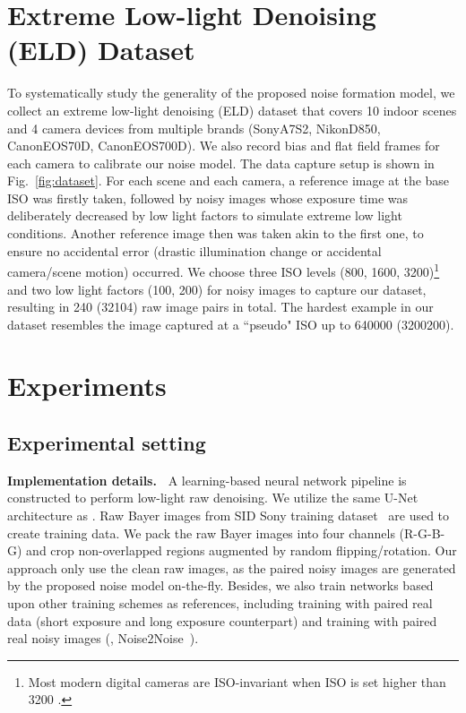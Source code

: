 \documentclass[10pt,twocolumn,letterpaper]{article}
\begin{document}
\section{Extreme Low-light Denoising (ELD) Dataset} \label{sec:eld-dataset}
To systematically study the generality of the proposed noise formation model, 
we collect an extreme low-light denoising (ELD) dataset that covers 10 indoor
scenes and 4 camera devices from multiple brands (SonyA7S2, NikonD850, CanonEOS70D, CanonEOS700D). We also record bias and flat field frames for each camera to calibrate our noise model. 
The data capture setup is shown in Fig.~\ref{fig:dataset}. 
For each scene and each camera, a reference image at the base ISO was firstly taken, followed by noisy images whose exposure time was deliberately decreased by low light factors  to simulate extreme low light conditions.  Another reference image then was taken akin to the first one, to ensure no accidental error (\eg drastic illumination change or accidental camera/scene motion) occurred.
We  choose three ISO levels (800, 1600, 3200)\footnote{Most modern digital cameras are ISO-invariant when ISO is set higher than 3200 \cite{ISOless_Clark}.} and two low light factors (100, 200) for noisy images to capture our dataset, resulting in 240 (32104) raw image pairs in total. The hardest example in our dataset resembles the image captured at a ``pseudo" ISO up to 640000 (3200200).

\section{Experiments}

\subsection{Experimental setting} \label{sec:implementation-details}
\noindent\textbf{Implementation details.~}
A learning-based neural network pipeline is constructed to perform low-light raw denoising. We utilize the same U-Net architecture  \cite{ronneberger2015u} as \cite{Chen_2018_CVPR}.
Raw Bayer images from SID Sony training
dataset~\cite{Chen_2018_CVPR} are used to create training data. We pack the raw Bayer images into four channels (R-G-B-G) and crop non-overlapped  regions augmented by random flipping/rotation.
Our approach only use the clean raw images, as the paired noisy images are generated by the proposed noise model on-the-fly.
Besides, we also train networks based upon other training schemes as references, including training with paired real data (short exposure and long exposure counterpart) and training with paired real noisy images (\ie, Noise2Noise~\cite{pmlr-v80-lehtinen18a}).
\end{document}
